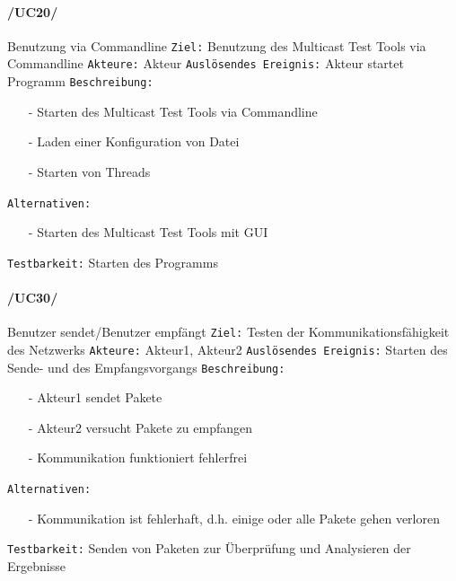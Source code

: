 \paragraph{/UC20/} Benutzung via Commandline\newline
\texttt{Ziel:} Benutzung des Multicast Test Tools via Commandline\newline
\texttt{Akteure:} Akteur\newline
\texttt{Auslösendes Ereignis:} Akteur startet Programm\newline
\texttt{Beschreibung:}
\begin{itemize}
 \item[-] Starten des Multicast Test Tools via Commandline
 \item[-] Laden einer Konfiguration von Datei
 \item[-] Starten von Threads
\end{itemize}
\texttt{Alternativen:}
\begin{itemize}
 \item[-] Starten des Multicast Test Tools mit GUI
\end{itemize}
\texttt{Testbarkeit:} Starten des Programms


\paragraph{/UC30/} Benutzer sendet/Benutzer empfängt\newline
\texttt{Ziel:} Testen der Kommunikationsfähigkeit des Netzwerks
\texttt{Akteure:} Akteur1, Akteur2\newline
\texttt{Auslösendes Ereignis:} Starten des Sende- und des
Empfangsvorgangs\newline 
\texttt{Beschreibung:}
\begin{itemize}
 \item[-] Akteur1 sendet Pakete\
 \item[-] Akteur2 versucht Pakete zu empfangen
 \item[-]Kommunikation funktioniert fehlerfrei
\end{itemize}
\texttt{Alternativen:}
\begin{itemize}
  \item[-] Kommunikation ist fehlerhaft, d.h. einige oder alle Pakete gehen
  verloren
\end{itemize}
\texttt{Testbarkeit:} Senden von Paketen zur Überprüfung und Analysieren der
Ergebnisse



